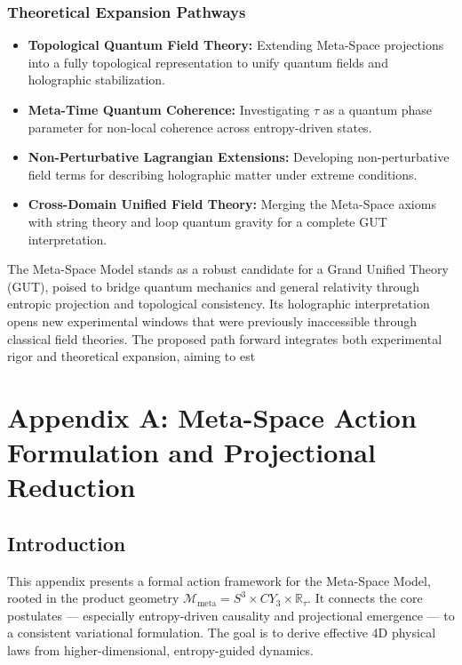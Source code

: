 \documentclass[10.5pt,a4paper]{article}
\begin{document}
\subsubsection{Theoretical Expansion Pathways}

\begin{itemize}
    \item \textbf{Topological Quantum Field Theory:} Extending Meta-Space projections into a fully topological representation to unify quantum fields and holographic stabilization.

    \item \textbf{Meta-Time Quantum Coherence:} Investigating \( \tau \) as a quantum phase parameter for non-local coherence across entropy-driven states.

    \item \textbf{Non-Perturbative Lagrangian Extensions:} Developing non-perturbative field terms for describing holographic matter under extreme conditions.

    \item \textbf{Cross-Domain Unified Field Theory:} Merging the Meta-Space axioms with string theory and loop quantum gravity for a complete GUT interpretation.
\end{itemize}

The Meta-Space Model stands as a robust candidate for a Grand Unified Theory (GUT), poised to bridge quantum mechanics and general relativity through entropic projection and topological consistency. Its holographic interpretation opens new experimental windows that were previously inaccessible through classical field theories. The proposed path forward integrates both experimental rigor and theoretical expansion, aiming to est

\clearpage

\section{Appendix A: Meta-Space Action Formulation and Projectional Reduction}

\renewcommand{\thesubsection}{A.\arabic{subsection}}

\subsection{Introduction}
This appendix presents a formal action framework for the Meta-Space Model,
rooted in the product geometry \( \mathcal{M}_{\text{meta}} = S^3 \times CY_3 \times \mathbb{R}_\tau \).
It connects the core postulates — especially entropy-driven causality and projectional emergence — to a consistent variational formulation.
The goal is to derive effective 4D physical laws from higher-dimensional, entropy-guided dynamics.
\end{document}
